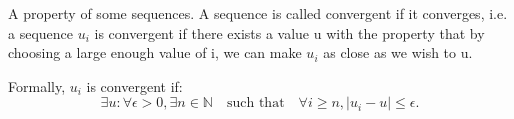 A property of some sequences. A sequence is called convergent if
it converges, i.e. a sequence $u_{i}$  is convergent if there
exists a value u with the property that by choosing a large enough 
value of i, we can make $u_{i}$  as close as we wish to u.
\par
Formally, $u_{i}$  is convergent if:
\[ \exists u : \forall \epsilon > 0 , \exists n \in \mathbb{N}
\quad\mbox{such that}\quad \forall i \geq n ,  | u_i - u | \leq \epsilon 
. \]